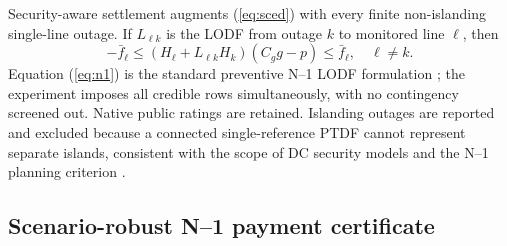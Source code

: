 \documentclass[10pt,journal]{IEEEtran}
\begin{document}
Security-aware settlement augments (\ref{eq:sced}) with every finite
non-islanding single-line outage. If $L_{\ell k}$ is the LODF from outage $k$
to monitored line $\ell$, then
\begin{equation}
 -\bar f_\ell\leq
 (H_\ell+L_{\ell k}H_k)(C_gg-p)\leq\bar f_\ell,
 \quad \ell\neq k.
 \label{eq:n1}
\end{equation}
Equation (\ref{eq:n1}) is the standard preventive N--1 LODF formulation
\cite{tejada2018lodf}; the experiment imposes all credible rows
simultaneously, with no contingency screened out. Native public ratings are
retained. Islanding outages are reported and excluded because a connected
single-reference PTDF cannot represent separate islands, consistent with the
scope of DC security models and the N--1 planning criterion
\cite{nerc2020tpl}.

\subsection{Scenario-robust N--1 payment certificate}
\end{document}
